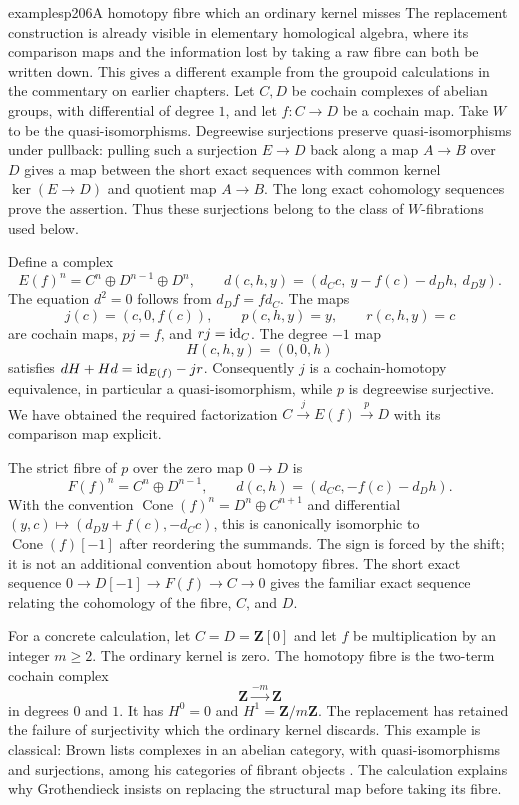 \begin{dcomment}{examples}{p206}{A homotopy fibre which an ordinary kernel misses}
The replacement construction is already visible in elementary homological algebra, where its comparison maps and the information lost by taking a raw fibre can both be written down. This gives a different example from the groupoid calculations in the commentary on earlier chapters. Let $C,D$ be cochain complexes of abelian groups, with differential of degree $1$, and let $f:C\to D$ be a cochain map. Take $W$ to be the quasi-isomorphisms. Degreewise surjections preserve quasi-isomorphisms under pullback: pulling such a surjection $E\to D$ back along a map $A\to B$ over $D$ gives a map between the short exact sequences with common kernel $\ker(E\to D)$ and quotient map $A\to B$. The long exact cohomology sequences prove the assertion. Thus these surjections belong to the class of $W$-fibrations used below.

Define a complex
\[
 E(f)^n=C^n\oplus D^{n-1}\oplus D^n,
 \qquad
 d(c,h,y)=(d_Cc,\ y-f(c)-d_Dh,\ d_Dy).
\]
The equation $d^2=0$ follows from $d_Df=fd_C$. The maps
\[
 j(c)=(c,0,f(c)),\qquad p(c,h,y)=y,\qquad r(c,h,y)=c
\]
are cochain maps, $pj=f$, and $rj=\mathrm{id}_C$. The degree $-1$ map
\[
 H(c,h,y)=(0,0,h)
\]
satisfies $dH+Hd=\mathrm{id}_{E(f)}-jr$. Consequently $j$ is a cochain-homotopy equivalence, in particular a quasi-isomorphism, while $p$ is degreewise surjective. We have obtained the required factorization $C\xrightarrow{j}E(f)\xrightarrow{p}D$ with its comparison map explicit.

The strict fibre of $p$ over the zero map $0\to D$ is
\[
 F(f)^n=C^n\oplus D^{n-1},\qquad
 d(c,h)=(d_Cc,-f(c)-d_Dh).
\]
With the convention $\operatorname{Cone}(f)^n=D^n\oplus C^{n+1}$ and differential $(y,c)\mapsto(d_Dy+f(c),-d_Cc)$, this is canonically isomorphic to $\operatorname{Cone}(f)[-1]$ after reordering the summands. The sign is forced by the shift; it is not an additional convention about homotopy fibres. The short exact sequence $0\to D[-1]\to F(f)\to C\to0$ gives the familiar exact sequence relating the cohomology of the fibre, $C$, and $D$.

For a concrete calculation, let $C=D=\mathbf Z[0]$ and let $f$ be multiplication by an integer $m\geq2$. The ordinary kernel is zero. The homotopy fibre is the two-term cochain complex
\[
 \mathbf Z\xrightarrow{-m}\mathbf Z
\]
in degrees $0$ and $1$. It has $H^0=0$ and $H^1=\mathbf Z/m\mathbf Z$. The replacement has retained the failure of surjectivity which the ordinary kernel discards. This example is classical: Brown lists complexes in an abelian category, with quasi-isomorphisms and surjections, among his categories of fibrant objects \citep[Part I, \S1, Example~3, p.~421]{Brown1973}. The calculation explains why Grothendieck insists on replacing the structural map before taking its fibre.
\end{dcomment}


